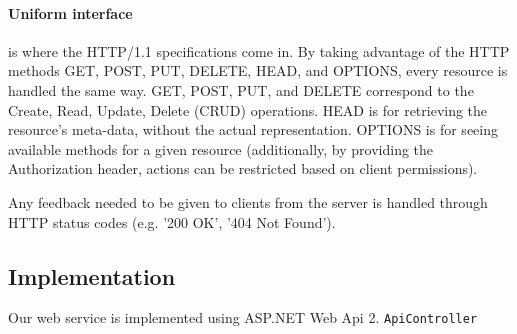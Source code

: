 \paragraph{Uniform interface} is where the HTTP/1.1 specifications come in.
By taking advantage of the HTTP methods GET, POST, PUT, DELETE, HEAD, and OPTIONS, every resource is handled the same way.
GET, POST, PUT, and DELETE correspond to the Create, Read, Update, Delete (CRUD) operations.
HEAD is for retrieving the resource's meta-data, without the actual representation.
OPTIONS is for seeing available methods for a given resource (additionally, by providing the Authorization header, actions can be restricted based on client permissions).

Any feedback needed to be given to clients from the server is handled through HTTP status codes (e.g. '200 OK', '404 Not Found').

\subsection{Implementation}
Our web service is implemented using ASP.NET Web Api 2\cite{aspnet_webapi_reference}.
\lstinline[style=csharp]!ApiController!
